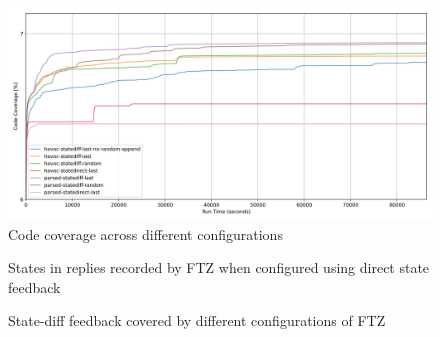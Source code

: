 \documentclass[twocolumn]{article}
\newcommand{\proj}{FTZ\xspace}
\begin{document}
\begin{figure}[t]
  \centering
  \includegraphics[width=\textwidth]{assets/eval/coverage-observer-by-run_time-plot.png}
  \caption{Code coverage across different configurations}
  \label{fig:eval-cov}
\end{figure}
\begin{figure}
  \caption{States in replies recorded by \proj when configured using direct state feedback}
  \label{fig:eval-state-cov}
\end{figure}
\begin{figure}
  \caption{State-diff feedback covered by different configurations of \proj}
  \label{fig:eval-state-diff-map}
\end{figure}
\end{document}
